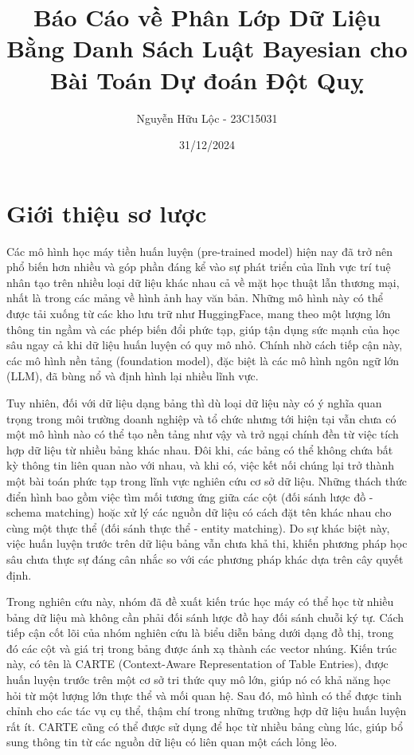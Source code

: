 \documentclass{article}
\title{Báo Cáo về Phân Lớp Dữ Liệu Bằng Danh Sách Luật Bayesian cho Bài Toán Dự đoán Đột Quỵ}
\author{Nguyễn Hữu Lộc - 23C15031}
\date{31/12/2024}
\begin{document}
\maketitle

\tableofcontents


\section{Giới thiệu sơ lược}
Các mô hình học máy tiền huấn luyện (pre-trained model) hiện nay đã trở nên phổ biến hơn nhiều và góp phần đáng kể vào sự phát triển của lĩnh vực trí tuệ nhân tạo trên nhiều loại dữ liệu khác nhau cả về mặt học thuật lẫn thương mại, nhất là trong các mảng về hình ảnh hay văn bản. Những mô hình này có thể được tải xuống từ các kho lưu trữ như HuggingFace, mang theo một lượng lớn thông tin ngầm và các phép biến đổi phức tạp, giúp tận dụng sức mạnh của học sâu ngay cả khi dữ liệu huấn luyện có quy mô nhỏ. Chính nhờ cách tiếp cận này, các mô hình nền tảng (foundation model), đặc biệt là các mô hình ngôn ngữ lớn (LLM), đã bùng nổ và định hình lại nhiều lĩnh vực.

Tuy nhiên, đối với dữ liệu dạng bảng thì dù loại dữ liệu này có ý nghĩa quan trọng trong môi trường doanh nghiệp và tổ chức nhưng tới hiện tại vẫn chưa có một mô hình nào có thể tạo nền tảng như vậy và trở ngại chính đền từ việc tích hợp dữ liệu từ nhiều bảng khác nhau. Đôi khi, các bảng có thể không chứa bất kỳ thông tin liên quan nào với nhau, và khi có, việc kết nối chúng lại trở thành một bài toán phức tạp trong lĩnh vực nghiên cứu cơ sở dữ liệu. Những thách thức điển hình bao gồm việc tìm mối tương ứng giữa các cột (đối sánh lược đồ - schema matching) hoặc xử lý các nguồn dữ liệu có cách đặt tên khác nhau cho cùng một thực thể (đối sánh thực thể - entity matching). Do sự khác biệt này, việc huấn luyện trước trên dữ liệu bảng vẫn chưa khả thi, khiến phương pháp học sâu chưa thực sự đáng cân nhắc so với các phương pháp khác dựa trên cây quyết định.

Trong nghiên cứu này, nhóm đã đề xuất kiến trúc học máy có thể học từ nhiều bảng dữ liệu mà không cần phải đối sánh lược đồ hay đối sánh chuỗi ký tự. Cách tiếp cận cốt lõi của nhóm nghiên cứu là biểu diễn bảng dưới dạng đồ thị, trong đó các cột và giá trị trong bảng được ánh xạ thành các vector nhúng. Kiến trúc này, có tên là CARTE (Context-Aware Representation of Table Entries), được huấn luyện trước trên một cơ sở tri thức quy mô lớn, giúp nó có khả năng học hỏi từ một lượng lớn thực thể và mối quan hệ. Sau đó, mô hình có thể được tinh chỉnh cho các tác vụ cụ thể, thậm chí trong những trường hợp dữ liệu huấn luyện rất ít. CARTE cũng có thể được sử dụng để học từ nhiều bảng cùng lúc, giúp bổ sung thông tin từ các nguồn dữ liệu có liên quan một cách lỏng lẻo.
\end{document}
